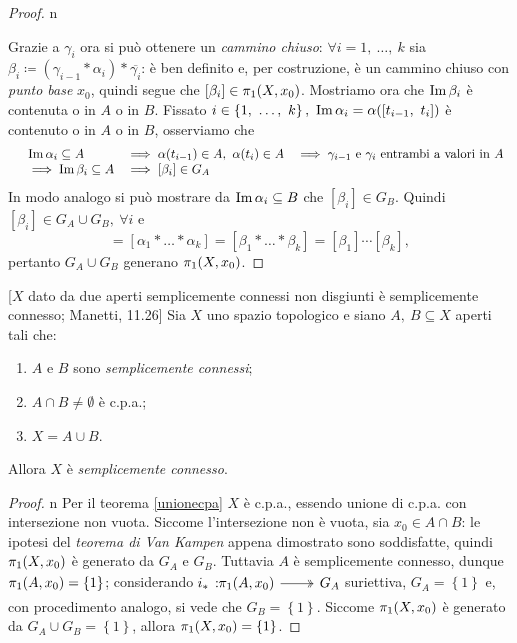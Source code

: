 \begin{proof}{n}
\begin{center}
	\end{center}
		\vspace{-6mm}
	Grazie a $\gamma_i$ ora si può ottenere un \textit{cammino chiuso}: $\forall i=1,\ \dots,\ k$ sia $\beta_i\coloneqq (\gamma_{i-1}\ast \alpha_i)\ast\overline{\gamma_i}$: è ben definito e, per costruzione, è un cammino chiuso con \textit{punto base} $x_0$, quindi segue che $[\beta_i]\in \homotopy[1]{X,x_0}$. Mostriamo ora che $\operatorname{Im} \beta_i$ è contenuta o in $A$ o in $B$. Fissato $i\in\left\{1,\ \dots,\ k\right\}, \ \img\alpha_i=\alpha([t_{i-1},\ t_i])$ è contenuto o in $A$ o in $B$, osserviamo che
		\begin{equation*}
			\begin{array}{llll}
				&\operatorname{Im}\alpha_i \subseteq A &\implies \alpha(t_{i-1})\in A,\ \alpha(t_i)\in A &\implies \gamma_{i-1} \text{ e } \gamma_i \text{ entrambi a valori in }A \\
				&\implies \operatorname{Im}\beta_i \subseteq A &\implies [\beta_i]\in G_A&\\
			\end{array}
		\end{equation*}
	In modo analogo si può mostrare da $\operatorname{Im}\alpha_i \subseteq B$ che $[\beta_i]\in G_B$. Quindi $[\beta_i]\in G_A\cup G_B,\ \forall i$ e
	\begin{equation*}
		[\alpha]=[\alpha_1 \ast \dots \ast\alpha_k]=[\beta_1\ast\dots\ast\beta_k]=[\beta_1]\cdots [\beta_k],
	\end{equation*}
pertanto $G_A\cup G_B$ generano $\homotopy[1]{X,x_0}$.\qedhere
\end{proof}
\begin{corollary}{}[$X$ dato da due aperti semplicemente connessi non disgiunti è semplicemente connesso; Manetti, 11.26]\label{corollario Van Kampen}
Sia $X$ uno spazio topologico e siano $A,\ B\subseteq X$ aperti tali che:
		\begin{enumerate}
			\item $A$ e $B$ sono \textit{semplicemente connessi};
			\item $A\cap B\neq\emptyset$ è c.p.a.;
			\item $X=A\cup B$.
		\end{enumerate}
	Allora $X$ è \textit{semplicemente connesso}.
\end{corollary}
\begin{proof}{n}
	Per il teorema \ref{unionecpa} $X$ è c.p.a., essendo unione di c.p.a. con intersezione non vuota. Siccome l'intersezione non è vuota, sia $x_0\in A\cap B$: le ipotesi del \textit{teorema di Van Kampen} appena dimostrato sono soddisfatte, quindi $\homotopy[1]{X,x_0}$ è generato da $G_A$ e $G_B$. Tuttavia $A$ è semplicemente connesso, dunque $\homotopy[1]{A,x_0}=\left\{1\right\}$; considerando $
		\funct{s}[i_\ast]{\homotopy[1]{A,x_0}}{G_A}$ suriettiva, $G_A=\left\{1\right\}$ e, con procedimento analogo, si vede che $G_B=\left\{1\right\}$. Siccome $\homotopy[1]{X,x_0}$ è generato da $G_A\cup G_B=\left\{1\right\}$, allora $\homotopy[1]{X,x_0}=\left\{1\right\}$.
\end{proof}
